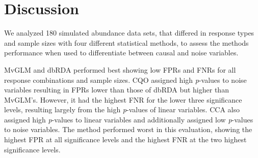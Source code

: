 
\section{Discussion}
	We analyzed 180 simulated abundance data sets, that differed in response types and sample sizes with four different statistical methods, to assess the methods performance when used to differentiate between causal and noise variables. 
	

    MvGLM and dbRDA performed best showing low FPRs and FNRs for all response combinations and sample sizes. 
    CQO assigned high \textit{p}-values to noise variables resulting in FPRs lower than those of dbRDA but higher than MvGLM's. 
    However, it had the highest FNR for the lower three significance levels, resulting largely from the high \textit{p}-values of linear variables. 
    CCA also assigned high \textit{p}-values to linear variables and additionally assigned low \textit{p}-values to noise variables. 
    The method performed worst in this evaluation, showing the highest FPR at all significance levels and the highest FNR at the two highest significance levels. \\
	
    
